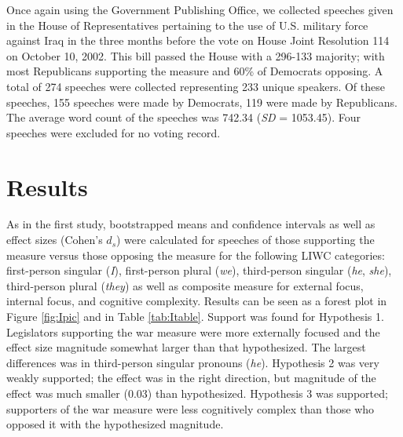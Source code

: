 \documentclass[english,,man]{apa6}
\begin{document}
Once again using the Government Publishing Office, we collected speeches given in the House of Representatives pertaining to the use of U.S. military force against Iraq in the three months before the vote on House Joint Resolution 114 on October 10, 2002. This bill passed the House with a 296-133 majority; with most Republicans supporting the measure and 60\% of Democrats opposing. A total of 274 speeches were collected representing 233 unique speakers. Of these speeches, 155 speeches were made by Democrats, 119 were made by Republicans. The average word count of the speeches was 742.34 (\emph{SD} = 1053.45). Four speeches were excluded for no voting record.

\hypertarget{results-2}{%
\section{Results}\label{results-2}}

As in the first study, bootstrapped means and confidence intervals as well as effect sizes (Cohen's \(d_s\)) were calculated for speeches of those supporting the measure versus those opposing the measure for the following LIWC categories: first-person singular (\emph{I}), first-person plural (\emph{we}), third-person singular (\emph{he}, \emph{she}), third-person plural (\emph{they}) as well as composite measure for external focus, internal focus, and cognitive complexity. Results can be seen as a forest plot in Figure \ref{fig:Ipic} and in Table \ref{tab:Itable}. Support was found for Hypothesis 1. Legislators supporting the war measure were more externally focused and the effect size magnitude somewhat larger than that hypothesized. The largest differences was in third-person singular pronouns (\emph{he}). Hypothesis 2 was very weakly supported; the effect was in the right direction, but magnitude of the effect was much smaller (0.03) than hypothesized. Hypothesis 3 was supported; supporters of the war measure were less cognitively complex than those who opposed it with the hypothesized magnitude.
\end{document}
